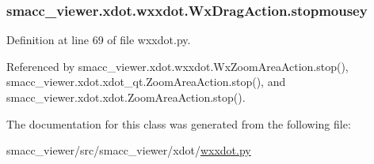 \subsubsection[{\texorpdfstring{stopmousey}{stopmousey}}]{\setlength{\rightskip}{0pt plus 5cm}smacc\+\_\+viewer.\+xdot.\+wxxdot.\+Wx\+Drag\+Action.\+stopmousey}\hypertarget{classsmacc__viewer_1_1xdot_1_1wxxdot_1_1WxDragAction_af4c5b01b183ba5f0c9889bcca25fc735}{}\label{classsmacc__viewer_1_1xdot_1_1wxxdot_1_1WxDragAction_af4c5b01b183ba5f0c9889bcca25fc735}


Definition at line 69 of file wxxdot.\+py.



Referenced by smacc\+\_\+viewer.\+xdot.\+wxxdot.\+Wx\+Zoom\+Area\+Action.\+stop(), smacc\+\_\+viewer.\+xdot.\+xdot\+\_\+qt.\+Zoom\+Area\+Action.\+stop(), and smacc\+\_\+viewer.\+xdot.\+xdot.\+Zoom\+Area\+Action.\+stop().



The documentation for this class was generated from the following file\+:\begin{DoxyCompactItemize}
\item 
smacc\+\_\+viewer/src/smacc\+\_\+viewer/xdot/\hyperlink{wxxdot_8py}{wxxdot.\+py}\end{DoxyCompactItemize}
